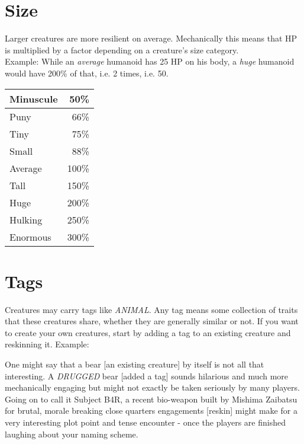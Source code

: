 \documentclass[12pt,a4paper,openany,usenames,dvipsnames]{book}
\begin{document}
	\section{Size}
	Larger creatures are more resilient on average. Mechanically this means that HP is multiplied by a factor depending on a creature's size category.\\
	Example: While an \emph{average} humanoid has 25 HP on his body, a \emph{huge} humanoid would have 200\% of that, i.e. 2 times, i.e. 50.\\
	\begin{center}
	\begin{tabular}{|l|r|}
		\hline
		Minuscule &  50\% \\ \hline
		Puny      &  66\% \\ \hline
		Tiny      &  75\% \\ \hline
		Small     &  88\% \\ \hline
		Average   & 100\% \\ \hline
		Tall      & 150\% \\ \hline
		Huge      & 200\% \\ \hline
		Hulking   & 250\% \\ \hline
		Enormous  & 300\% \\ \hline
	\end{tabular}
	\end{center}

	\section{Tags}
	Creatures may carry tags like \emph{ANIMAL}. Any tag means some collection of traits that these creatures share, whether they are generally similar or not. If you want to create your own creatures, start by adding a tag to an existing creature and reskinning it. Example:\par
	\begin{exampleblock}
		One might say that a bear [an existing creature] by itself is not all that interesting. A \emph{DRUGGED} bear [added a tag] sounds hilarious and much more mechanically engaging but might not exactly be taken seriously by many players.\\
		Going on to call it Subject B4R, a recent bio-weapon built by Mishima Zaibatsu for brutal, morale breaking close quarters engagements [reskin] might make for a very interesting plot point and tense encounter - once the players are finished laughing about your naming scheme.
	\end{exampleblock}
	
\end{document}
